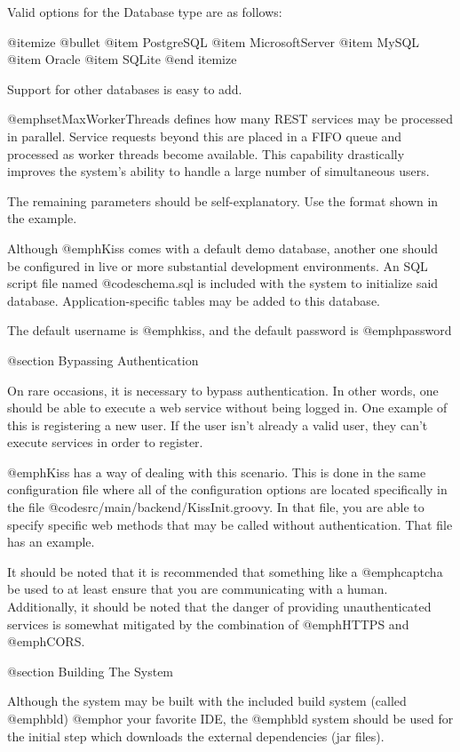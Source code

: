 Valid options for the Database type are as follows:

@itemize @bullet
@item
PostgreSQL
@item
MicrosoftServer
@item
MySQL
@item
Oracle
@item
SQLite
@end itemize

Support for other databases is easy to add.

@emph{setMaxWorkerThreads} defines how many REST services may be
processed in parallel.  Service requests beyond this are placed in a
FIFO queue and processed as worker threads become available.  This
capability drastically improves the system's ability to handle a large
number of simultaneous users.

The remaining parameters should be self-explanatory.  Use the format
shown in the example.

Although @emph{Kiss} comes with a default demo database, another one
should be configured in live or more substantial development
environments.  An SQL script file named @code{schema.sql} is included
with the system to initialize said database.  Application-specific tables
may be added to this database.

The default username is @emph{kiss}, and the default password is
@emph{password}

@section Bypassing Authentication

On rare occasions, it is necessary to bypass authentication.  In other
words, one should be able to execute a web service without being logged in.  One
example of this is registering a new user.  If the user isn't already a
valid user, they can't execute services in order to register.

@emph{Kiss} has a way of dealing with this scenario.  This is done in
the same configuration file where all of the configuration options are
located specifically in the file @code{src/main/backend/KissInit.groovy}.  In
that file, you are able to specify specific web methods that may be
called without authentication.  That file has an example.

It should be noted that it is recommended that something like a
@emph{captcha} be used to at least ensure that you are
communicating with a human.  Additionally, it should be noted that the
danger of providing unauthenticated services is somewhat mitigated by
the combination of @emph{HTTPS} and @emph{CORS}.

@section Building The System

Although the system may be built with the included build system
(called @emph{bld}) @emph{or} your favorite IDE, the @emph{bld}
system should be used for the initial step which downloads the external
dependencies (jar files).

